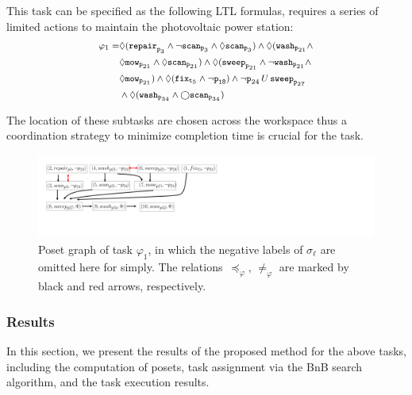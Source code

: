 This task can be specified as the following LTL formulas, 
requires a series of limited actions to 
maintain the photovoltaic power station:
\begin{equation}\footnotesize
\label{eq:task1}
  \begin{aligned}
\varphi_1 = & \Diamond(\texttt{repair}_{\texttt{p}_{3}} \wedge \lnot \texttt{scan}_{\texttt{p}_3} \wedge\Diamond \texttt{scan}_{\texttt{p}_3})
\wedge \Diamond (\texttt{wash}_{\texttt{p}_{21}} \wedge \\
&\Diamond \texttt{mow}_{\texttt{p}_{21}} \wedge \Diamond \texttt{scan}_{\texttt{p}_{21}}) \wedge \Diamond ( \texttt{sweep}_{\texttt{p}_{21}} \wedge \lnot \texttt{wash}_{\texttt{p}_{21}} \wedge\\
& \Diamond \texttt{mow}_{\texttt{p}_{21}}) \wedge \Diamond(\texttt{fix}_{\texttt{t}_5} \wedge \lnot \texttt{p}_{\texttt{18}}) \wedge \lnot \texttt{p}_{24} \,U \, \texttt{sweep}_{\texttt{p}_{27}} \\
&\wedge \Diamond (\texttt{wash}_{\texttt{p}_{34}} \wedge \bigcirc \texttt{scan}_{\texttt{p}_{34}})
\end{aligned}
\end{equation}

The location of these subtasks are chosen across the workspace
thus a coordination strategy to minimize completion time is crucial for the task.



\begin{figure}[t!] 
		\centering%
		\includegraphics[height = 0.12 \textwidth]{figures/simulation/taskfinal/ipe_poset_graph.pdf}
	\caption{Poset graph of task $\varphi_1$, in which the negative labels of $\sigma_\ell$ are omitted here for simply.
          The relations~$\preceq_\varphi,\, \neq_{\varphi}$ are marked
          by black and red arrows, respectively.}
       \label{fig:task12-posets}
\end{figure}

\subsubsection{Results}\label{subsubsec:results}
In this section, we present the results of the proposed method for
the above tasks, including the computation of posets,
task assignment via the BnB search algorithm, and the task execution results.

